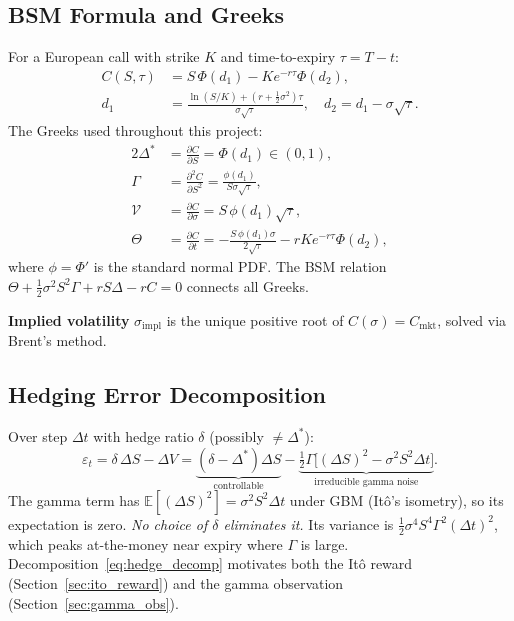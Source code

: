 \documentclass[12pt,a4paper]{article}
\begin{document}
\subsection{BSM Formula and Greeks}

For a European call with strike $K$ and time-to-expiry $\tau = T-t$:
\begin{align}
  C(S,\tau) &= S\,\Phi(d_1) - Ke^{-r\tau}\Phi(d_2),
  \label{eq:bsm}\\
  d_{1} &= \frac{\ln(S/K)+(r+\tfrac12\sigma^2)\tau}{\sigma\sqrt{\tau}},
  \quad d_2 = d_1 - \sigma\sqrt{\tau}.
  \label{eq:d1d2}
\end{align}
The Greeks used throughout this project:
\begin{alignat}{2}
  \Delta^* &= \frac{\partial C}{\partial S} = \Phi(d_1) \in (0,1),
  \label{eq:delta}\\
  \Gamma    &= \frac{\partial^2 C}{\partial S^2}
             = \frac{\phi(d_1)}{S\sigma\sqrt{\tau}},
  \label{eq:gamma}\\
  \mathcal{V} &= \frac{\partial C}{\partial\sigma}
               = S\,\phi(d_1)\sqrt{\tau},
  \label{eq:vega}\\
  \Theta    &= \frac{\partial C}{\partial t}
             = -\frac{S\,\phi(d_1)\sigma}{2\sqrt{\tau}}
               - rKe^{-r\tau}\Phi(d_2),
  \label{eq:theta}
\end{alignat}
where $\phi = \Phi'$ is the standard normal PDF.
The BSM relation $\Theta + \tfrac12\sigma^2S^2\Gamma + rS\Delta - rC = 0$
connects all Greeks.

\textbf{Implied volatility} $\sigma_{\mathrm{impl}}$ is the unique positive
root of $C(\sigma) = C_{\mathrm{mkt}}$, solved via Brent's method.

\subsection{Hedging Error Decomposition}

Over step $\Delta t$ with hedge ratio $\delta$ (possibly $\neq\Delta^*$):
\begin{equation}
  \varepsilon_t = \delta\,\Delta S - \Delta V
  = \underbrace{(\delta-\Delta^*)\Delta S}_{\text{controllable}}
    -\underbrace{\tfrac12\Gamma\bigl[(\Delta S)^2 - \sigma^2 S^2\Delta t\bigr]}
                _{\text{irreducible gamma noise}}.
  \label{eq:hedge_decomp}
\end{equation}
The gamma term has $\mathbb{E}[(\Delta S)^2] = \sigma^2 S^2\Delta t$ under
GBM (It\^{o}'s isometry), so its expectation is zero.
\emph{No choice of $\delta$ eliminates it.}
Its variance is $\tfrac12\sigma^4 S^4\Gamma^2(\Delta t)^2$, which peaks at-the-money
near expiry where $\Gamma$ is large.  Decomposition~\eqref{eq:hedge_decomp}
motivates both the It\^{o} reward (Section~\ref{sec:ito_reward}) and the gamma
observation (Section~\ref{sec:gamma_obs}).
\end{document}
